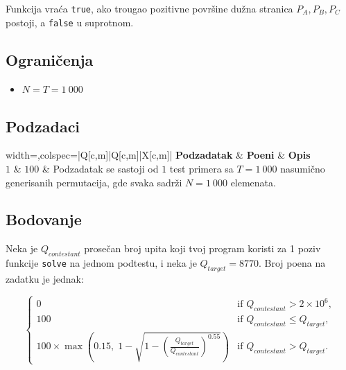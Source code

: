 \documentclass[12pt]{article}
\begin{document}
Funkcija vraća \texttt{true}, ako trougao pozitivne površine dužna stranica $P_A,P_B,P_C$ postoji, a \texttt{false} u suprotnom.

\subsection{Ograničenja}
\vspace{0.1em}
\begin{itemize}
	\item $N = T = 1~000$
\end{itemize}

\subsection{Podzadaci}
\begin{table}[H]
	\begin{tblr}{width=\linewidth,colspec={|Q[c,m]|Q[c,m]|X[c,m]|}}
		\hline
		\textbf{Podzadatak} & \textbf{Poeni} & \textbf{Opis}\\
		\hline
		$1$ & $100$ & Podzadatak se sastoji od $1$ test primera sa $T=1~000$ nasumično generisanih permutacija, gde svaka sadrži $N=1~000$ elemenata.  \\ 
		\hline
	\end{tblr}
	\caption*{The points for a given subtask are obtained only if all the tests for it.}
\end{table}
\FloatBarrier

\newpage
\subsection{Bodovanje}

Neka je $Q_{contestant}$ prosečan broj upita koji tvoj program koristi za 1 poziv funkcije \texttt{solve} na jednom podtestu, i neka je $Q_{target}=8770$. Broj poena na zadatku je jednak:

\[
\begin{cases}
0 & \text{if } Q_{contestant} > 2\times 10^6, \\
100 & \text{if } Q_{contestant} \le Q_{target}, \\
100 \times \max\left(0.15,\; 1-\sqrt{1-\left(\frac{Q_{target}}{Q_{contestant}}\right)^{0.55}}\right) & \text{if } Q_{contestant} > Q_{target}.
\end{cases}
\]
\end{document}
